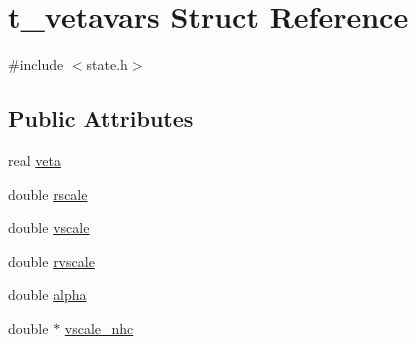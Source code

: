 \hypertarget{structt__vetavars}{\section{t\-\_\-vetavars \-Struct \-Reference}
\label{structt__vetavars}
}


{\ttfamily \#include $<$state.\-h$>$}

\subsection*{\-Public \-Attributes}
\begin{DoxyCompactItemize}
\item 
real \hyperlink{structt__vetavars_a79f734722710e91d8a0d665de464c076}{veta}
\item 
double \hyperlink{structt__vetavars_a7082dee56613a50761687ff11209c46f}{rscale}
\item 
double \hyperlink{structt__vetavars_a2fe480b09f4395ef7bebf4eedd459cf9}{vscale}
\item 
double \hyperlink{structt__vetavars_ad7f04f0c653fd1a8b8a879c22bf718dd}{rvscale}
\item 
double \hyperlink{structt__vetavars_a4b2316bb5d3b43b7593b3c5e85bf4598}{alpha}
\item 
double $\ast$ \hyperlink{structt__vetavars_a7017fbea56da900effc4100784b22894}{vscale\-\_\-nhc}
\end{DoxyCompactItemize}


